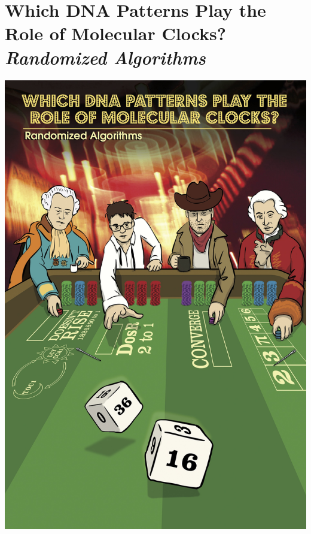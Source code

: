 \documentclass{article}
\begin{document}
\section{Which DNA Patterns Play the Role of Molecular Clocks?\\ \normalfont\emph{Randomized Algorithms}}
\begin{center}
    \includegraphics[scale=0.72]{c2/c2.jpg}
\end{center}
\pagebreak
\end{document}
